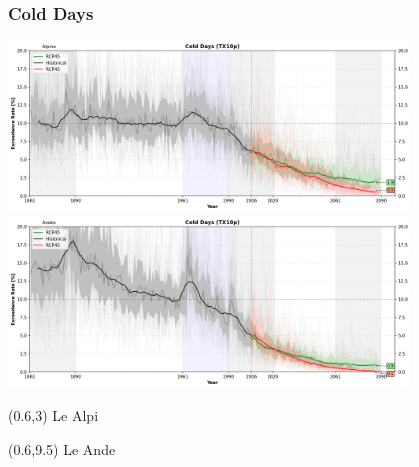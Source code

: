
\begin{frame}
\frametitle{Cold Days}
\begin{center}

{\includegraphics[width=0.8\textwidth]{risultati/tx10p_Alpine_Models_ts_lim_20}}
{\includegraphics[width=0.8\textwidth]{risultati/tx10p_Andes_Models_ts_lim_20}}
\end{center}

{
  \scriptsize
  \begin{textblock}{1.8}(0.6,3)
     {\color{gray} Le Alpi}
  \end{textblock}
}


{
  \scriptsize
  \begin{textblock}{1.8}(0.6,9.5)
     {\color{gray} Le Ande}
  \end{textblock}
}

\end{frame}




